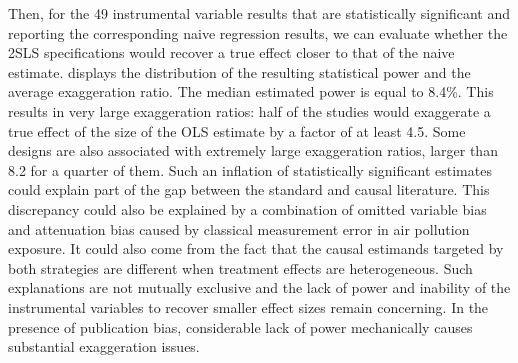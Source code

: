 \documentclass[12pt]{article}
\begin{document}
        
        Then, for the 49 instrumental variable results that are statistically significant and reporting the corresponding naive regression results, we can evaluate whether the 2SLS specifications would recover a true effect closer to that of the naive estimate.  displays the distribution of the resulting statistical power and the average exaggeration ratio. The median estimated power is equal to 8.4\%. This results in very large exaggeration ratios: half of the studies would exaggerate a true effect of the size of the OLS estimate by a factor of at least 4.5. Some designs are also associated with extremely large exaggeration ratios, larger than 8.2 for a quarter of them. Such an inflation of statistically significant estimates could explain part of the gap between the standard and causal literature. This discrepancy could also be explained by a combination of omitted variable bias and attenuation bias caused by classical measurement error in air pollution exposure. It could also come from the fact that the causal estimands targeted by both strategies are different when treatment effects are heterogeneous. Such explanations are not mutually exclusive and the lack of power and inability of the instrumental variables to recover smaller effect sizes remain concerning. In the presence of publication bias, considerable lack of power mechanically causes substantial exaggeration issues.
        
\end{document}
